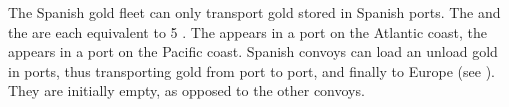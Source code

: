 \label{chIncomes:SpanishConvoys} The Spanish gold
fleet can only transport gold stored in Spanish ports. The  and the  are each equivalent to 5 \NTD.
\bparag The  appears in a port on the Atlantic coast, the
 appears in a port on the Pacific coast.
\bparag Spanish convoys can load an unload gold in ports, thus transporting
gold from port to port, and finally to Europe (see
). They are initially empty, as opposed
to the other convoys.








%

